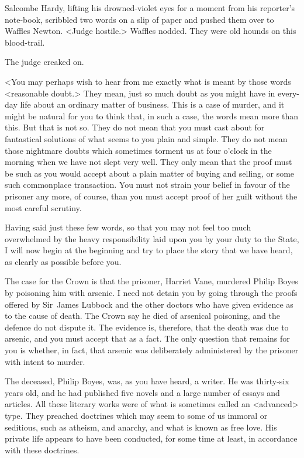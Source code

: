Salcombe Hardy, lifting his drowned-violet eyes for a moment from his reporter's note-book, scribbled two words on a slip of paper and pushed them over to Waffles Newton. <Judge hostile.> Waffles nodded. They were old hounds on this blood-trail.

The judge creaked on.

<You may perhaps wish to hear from me exactly what is meant by those words <reasonable doubt.> They mean, just so much doubt as you might have in every-day life about an ordinary matter of business. This is a case of murder, and it might be natural for you to think that, in such a case, the words mean more than this. But that is not so. They do not mean that you must cast about for fantastical solutions of what seems to you plain and simple. They do not mean those nightmare doubts which sometimes torment us at four o'clock in the morning when we have not slept very well. They only mean that the proof must be such as you would accept about a plain matter of buying and selling, or some such commonplace transaction. You must not strain your belief in favour of the prisoner any more, of course, than you must accept proof of her guilt without the most careful scrutiny.

Having said just these few words, so that you may not feel too much overwhelmed by the heavy responsibility laid upon you by your duty to the State, I will now begin at the beginning and try to place the story that we have heard, as clearly as possible before you.

The case for the Crown is that the prisoner, Harriet Vane, murdered Philip Boyes by poisoning him with arsenic. I need not detain you by going through the proofs offered by Sir~James Lubbock and the other doctors who have given evidence as to the cause of death. The Crown say he died of arsenical poisoning, and the defence do not dispute it. The evidence is, therefore, that the death was due to arsenic, and you must accept that as a fact. The only question that remains for you is whether, in fact, that arsenic was deliberately administered by the prisoner with intent to murder.

The deceased, Philip Boyes, was, as you have heard, a writer. He was thirty-six years old, and he had published five novels and a large number of essays and articles. All these literary works were of what is sometimes called an <advanced> type. They preached doctrines which may seem to some of us immoral or seditious, such as atheism, and anarchy, and what is known as free love. His private life appears to have been conducted, for some time at least, in accordance with these doctrines.

